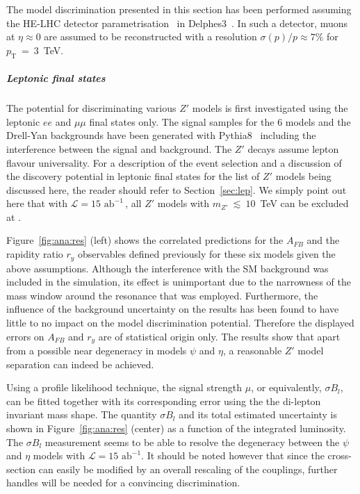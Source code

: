 \documentclass[a4paper,11pt]{article}
\newcommand{\pt}{\ensuremath{p_{\text{T}}}}
\newcommand*{\intlumihelhc}{\ensuremath{\mathcal{L}=15\text{ ab}^{-1}}}
\newcommand{\py}{{\sc Pythia8}}
\newcommand{\delphes}{{\sc Delphes3}}
\begin{document}
The model discrimination presented in this section has been performed assuming the HE-LHC detector parametrisation~\cite{hlhelhc_web} in \delphes~\cite{deFavereau:2013fsa}. In such a detector, muons at $\eta \approx 0$ are assumed to be reconstructed with a resolution $\sigma(p)/p \approx 7\%$ for $\pt~=~3 $~TeV.

\subparagraph*{Leptonic final states}
\label{par:lepana}

The potential for discriminating various $Z'$ models is first investigated using the leptonic $ee$ and $\mu\mu$ final states only. The signal samples for the 6 models and the Drell-Yan backgrounds have been generated with \py~\cite{Sjostrand:2014zea} including the interference between the signal and background. The $Z'$ decays assume lepton flavour universality. For a description of the event selection and a discussion of the discovery potential in leptonic final states for the list of $Z'$ models being discussed here, the reader should refer to Section~\ref{sec:lep}. We simply point out here that with \intlumihelhc\,, all $Z'$ models with $m_{Z'}~\lesssim~10$~TeV can be excluded at \sqrtshelhc.

Figure~\ref{fig:ana:res} (left) shows the correlated predictions for the $A_{FB}$ and the rapidity ratio $r_y$ observables defined previously for these six models given the above assumptions. Although the interference with the SM background was included in the simulation, its effect is unimportant due to the narrowness of the mass window around the resonance that was employed. Furthermore, the influence of the background uncertainty on the results has been found to have little to no impact on the model discrimination potential. Therefore the displayed errors on $A_{FB}$ and $r_y$ are of statistical origin only. The results show that apart from a possible near degeneracy in models $\psi$ and $\eta$, a reasonable $Z'$ model separation can indeed be achieved.

Using a profile likelihood technique, the signal strength $\mu$, or equivalently, $\sigma B_l$, can be fitted together with its corresponding error using the the di-lepton invariant mass shape. The quantity $\sigma B_l$ and its total estimated uncertainty is shown in Figure~\ref{fig:ana:res} (center) as a function of the integrated luminosity. The $\sigma B_l$ measurement seems to be able to resolve the degeneracy between the $\psi$ and $\eta$ models with \intlumihelhc. It should be noted however that since the cross-section can easily be modified by an overall rescaling of the couplings, further handles will be needed for a convincing discrimination.
\end{document}
